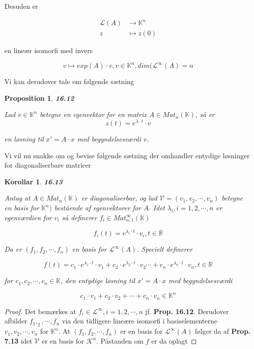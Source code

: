 \documentclass[paper=a4, fontsize=11pt]{scrartcl} %
\newtheorem*{korollar}{Korollar}
\newtheorem*{proposition}{Proposition}
\newenvironment{cstmproposition}[1]{\begin{proposition} {\normalfont\textbf{#1}}}{\end{proposition}}
\newenvironment{cstmkorollar}[1]{\begin{korollar} {\normalfont\textbf{#1}}}{\end{korollar}}
\begin{document}
	Desuden er 
	
	\begin{align*}
		\mathcal{L}(A) &\rightarrow \mathbb{K}^n\\
		z &\mapsto z(0)
	\end{align*}
	
	en lineær isomorfi med invers
	
	\[v \mapsto exp(A) \cdot v, v \in \mathbb{K}^n, dim(\mathcal{L}^{\infty}(A) = n\]
	
	Vi kan derudover tale om følgende sætning
	
	\begin{cstmproposition}{16.12}
		
		Lad $v \in \mathbb{K}^n$ betegne en egenvektor for en matrix $A \in Mat_n(\mathbb{K})$, så er 
		\[z(t) = e^{\lambda \cdot t} \cdot v\]
		
		en løsning til $x' = A \cdot x$ med begyndelsesværdi $v$.
		
	\end{cstmproposition}
	
	
	Vi vil nu snakke om og bevise følgende sætning der omhandler entydige løsninger for diagonaliserbare matricer
	
	\begin{cstmkorollar}{16.13}
		
		
		Antag at $A \in Mat_n(\mathbb{K})$ er diagonaliserbar, og lad $\mathcal{V} = (v_1,v_2,\cdots,v_n)$ betegne en basis for $\mathbb{K}^n)$ bestående af egenvektorer for $A$. Idet $\lambda_i, i = 1,2,\cdots,n$ er egenværdien for $v_i$ så definerer $f_i \in Mat_{n,1}^{\infty}(\mathbb{K})$ 
		
		\[f_i(t) = e^{\lambda_i \cdot t} \cdot v_i, t \in \mathbb{R}\]
		
		Da er $(f_1,f_2,\cdots,f_n)$ en basis for $\mathcal{L}^{\infty}(A)$. Specielt definerer
		
		\[f(t) = c_1 \cdot e^{\lambda_1 \cdot t} \cdot v_1 + c_2 \cdot e^{\lambda_2 \cdot t} \cdot v_2 \cdots + c_n \cdot e^{\lambda_n \cdot t} \cdot v_n, t \in \mathbb{R}\]
		
		for $c_1,c_2,\cdots,c_n \in \mathbb{K}$, den entydige løsning til $x' = A \cdot x$ med begyndelsesværdi 
		
		\[c_1 \cdot v_1 + c_2 \cdot v_2 + \cdots + c_n \cdot v_n \in \mathbb{K}^n\] 
		
	\end{cstmkorollar}
	
	\begin{proof}
		
		Det bemærkes at $f_i \in \mathcal{L}^{\infty}, i = 1,2,\cdots,n$ jf. \textbf{Prop. 16.12}. Derudover afbilder $f_1,_2,\cdots,f_n$ via den tidligere lineære isomorfi i basiselementerne $v_1,v_2,\cdots,v_n$ for $\mathbb{K}^n$. At $(f_1,f_2,\cdots,f_n)$ er en basis for $\mathcal{L}^{\infty}(A)$ følger da af \textbf{Prop. 7.13} idet $\mathcal{V}$ er en basis for $\mathcal{K}^n$. Påstanden om $f$ er da oplagt
		
	\end{proof}
	
	
	
	
\end{document}
